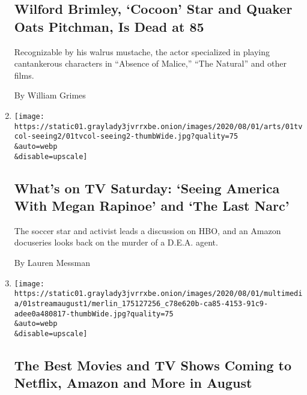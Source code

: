 \begin{enumerate}
  \hypertarget{wilford-brimley-cocoon-star-and-quaker-oats-pitchman-is-dead-at-85}{%
  \subsection{Wilford Brimley, `Cocoon' Star and Quaker Oats Pitchman,
  Is Dead at
  85}\label{wilford-brimley-cocoon-star-and-quaker-oats-pitchman-is-dead-at-85}}

  Recognizable by his walrus mustache, the actor specialized in playing
  cantankerous characters in ``Absence of Malice,'' ``The Natural'' and
  other films.

  By William Grimes
\item
  \href{/2020/08/01/arts/television/whats-on-tv-saturday-seeing-america-with-megan-rapinoe-and-the-last-narc.html}{}

  \texttt{[image: https://static01.graylady3jvrrxbe.onion/images/2020/08/01/arts/01tvcol-seeing2/01tvcol-seeing2-thumbWide.jpg?quality=75\\\&auto=webp\\\&disable=upscale]}

  \hypertarget{whats-on-tv-saturday-seeing-america-with-megan-rapinoe-and-the-last-narc}{%
  \subsection{What's on TV Saturday: `Seeing America With Megan Rapinoe'
  and `The Last
  Narc'}\label{whats-on-tv-saturday-seeing-america-with-megan-rapinoe-and-the-last-narc}}

  The soccer star and activist leads a discussion on HBO, and an Amazon
  docuseries looks back on the murder of a D.E.A. agent.

  By Lauren Messman
\item
  \href{/2020/07/31/arts/television/new-to-stream-netflix.html}{}

  \texttt{[image: https://static01.graylady3jvrrxbe.onion/images/2020/08/01/multimedia/01streamaugust1/merlin\_175127256\_c78e620b-ca85-4153-91c9-adee0a480817-thumbWide.jpg?quality=75\\\&auto=webp\\\&disable=upscale]}

  \hypertarget{the-best-movies-and-tv-shows-coming-to-netflix-amazon-and-more-in-august}{%
  \subsection{The Best Movies and TV Shows Coming to Netflix, Amazon and
  More in
  August}\label{the-best-movies-and-tv-shows-coming-to-netflix-amazon-and-more-in-august}}


\end{enumerate}
